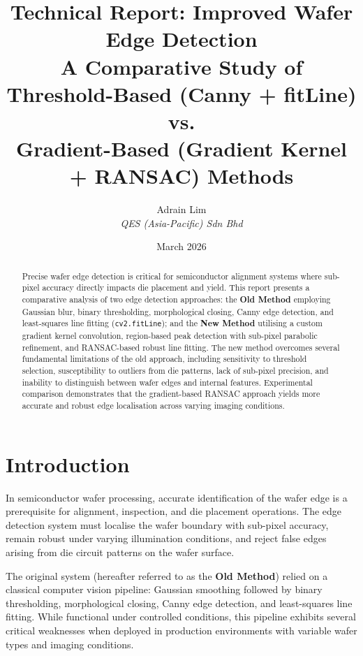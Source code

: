 \documentclass[12pt, a4paper]{article}
\title{
    \vspace{-1cm}
    \textbf{Technical Report: Improved Wafer Edge Detection} \\[0.3cm]
    \large A Comparative Study of Threshold-Based (Canny + fitLine) vs.\\
    Gradient-Based (Gradient Kernel + RANSAC) Methods
}
\author{
    Adrain Lim \\
    \textit{QES (Asia-Pacific) Sdn Bhd}
}
\date{March 2026}
\begin{document}
\maketitle
\thispagestyle{fancy}

\begin{abstract}
Precise wafer edge detection is critical for semiconductor alignment systems where sub-pixel accuracy directly impacts die placement and yield. This report presents a comparative analysis of two edge detection approaches: the \textbf{Old Method} employing Gaussian blur, binary thresholding, morphological closing, Canny edge detection, and least-squares line fitting (\texttt{cv2.fitLine}); and the \textbf{New Method} utilising a custom gradient kernel convolution, region-based peak detection with sub-pixel parabolic refinement, and RANSAC-based robust line fitting. The new method overcomes several fundamental limitations of the old approach, including sensitivity to threshold selection, susceptibility to outliers from die patterns, lack of sub-pixel precision, and inability to distinguish between wafer edges and internal features. Experimental comparison demonstrates that the gradient-based RANSAC approach yields more accurate and robust edge localisation across varying imaging conditions.
\end{abstract}

\section{Introduction}

In semiconductor wafer processing, accurate identification of the wafer edge is a prerequisite for alignment, inspection, and die placement operations. The edge detection system must localise the wafer boundary with sub-pixel accuracy, remain robust under varying illumination conditions, and reject false edges arising from die circuit patterns on the wafer surface.

The original system (hereafter referred to as the \textbf{Old Method}) relied on a classical computer vision pipeline: Gaussian smoothing followed by binary thresholding, morphological closing, Canny edge detection, and least-squares line fitting. While functional under controlled conditions, this pipeline exhibits several critical weaknesses when deployed in production environments with variable wafer types and imaging conditions.
\end{document}
